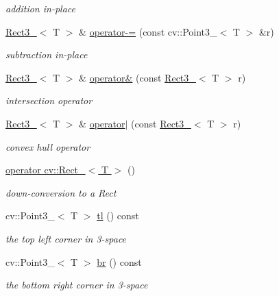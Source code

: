 \begin{DoxyCompactItemize}
\begin{DoxyCompactList}\small\item\em addition in-\/place \end{DoxyCompactList}\item 
\hyperlink{class_rect3__}{Rect3\-\_\-}$<$ T $>$ \& \hyperlink{class_rect3___a3a626255017a7cef76e065c51ef1504f}{operator-\/=} (const cv\-::\-Point3\-\_\-$<$ T $>$ \&r)
\begin{DoxyCompactList}\small\item\em subtraction in-\/place \end{DoxyCompactList}\item 
\hyperlink{class_rect3__}{Rect3\-\_\-}$<$ T $>$ \& \hyperlink{class_rect3___a24609371fde6d5c8383dbb210bb75b5e}{operator\&} (const \hyperlink{class_rect3__}{Rect3\-\_\-}$<$ T $>$ r)
\begin{DoxyCompactList}\small\item\em intersection operator \end{DoxyCompactList}\item 
\hyperlink{class_rect3__}{Rect3\-\_\-}$<$ T $>$ \& \hyperlink{class_rect3___a0f988dcf6a9ad19243844abf4acba653}{operator$|$} (const \hyperlink{class_rect3__}{Rect3\-\_\-}$<$ T $>$ r)
\begin{DoxyCompactList}\small\item\em convex hull operator \end{DoxyCompactList}\item 
\hyperlink{class_rect3___a4f49b82908b88ed545690bfff932ea30}{operator cv\-::\-Rect\-\_\-$<$ T $>$} ()
\begin{DoxyCompactList}\small\item\em down-\/conversion to a Rect \end{DoxyCompactList}\item 
cv\-::\-Point3\-\_\-$<$ T $>$ \hyperlink{class_rect3___a8df208aa3d316ea706a529db292d1a0f}{tl} () const 
\begin{DoxyCompactList}\small\item\em the top left corner in 3-\/space \end{DoxyCompactList}\item 
cv\-::\-Point3\-\_\-$<$ T $>$ \hyperlink{class_rect3___a253d895d86ec7718351f29ff3cd0cd27}{br} () const 
\begin{DoxyCompactList}\small\item\em the bottom right corner in 3-\/space \end{DoxyCompactList}\item 

\end{DoxyCompactItemize}
